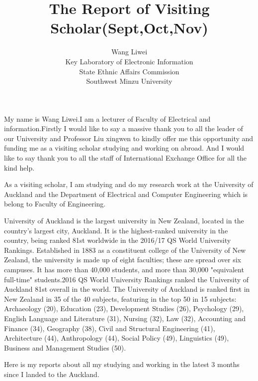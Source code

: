 \documentclass[12pt]{article}
\title{The Report of Visiting Scholar(Sept,Oct,Nov)}
\author{Wang Liwei \\Key Laboratory of Electronic Information \\ State Ethnic Affairs Commission\\Southwest Minzu University}
\date{  }
\begin{document}
\maketitle

\section *{\vspace{-1.5cm} }
My name is Wang Liwei.I am a lecturer of Faculty of Electrical and information.Firstly I would like to say a massive thank you to all the leader of our University and Professor Liu xingwen to kindly offer me this opportunity and funding me as a visiting scholar studying and working on abroad. And I would like to say thank you to all the staff of International Exchange Office for all the kind help.
\par
As a visiting scholar, I am studying and do my research work at the University of Auckland and the Department of Electrical and Computer Engineering which is belong to Faculty of Engineering. 
\par
University of Auckland   is the largest university in New Zealand, located in the country's largest city, Auckland. It is the highest-ranked university in the country, being ranked 81st worldwide in the 2016/17 QS World University Rankings. Established in 1883 as a constituent college of the University of New Zealand, the university is made up of eight faculties; these are spread over six campuses. It has more than 40,000 students, and more than 30,000 "equivalent full-time" students.2016 QS World University Rankings ranked the University of Auckland 81st overall in the world. The University of Auckland is ranked first in New Zealand in 35 of the 40 subjects, featuring in the top 50 in 15 subjects: Archaeology (20), Education (23), Development Studies (26), Psychology (29), English Language and Literature (31), Nursing (32), Law (32), Accounting and Finance (34), Geography (38), Civil and Structural Engineering (41), Architecture (44), Anthropology (44), Social Policy (49), Linguistics (49), Business and Management Studies (50).
\par
Here is my reports about all my studying and working in the latest 3 months since I landed to the Auckland. 
\end{document}
